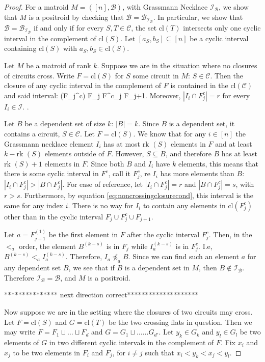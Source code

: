 \documentclass[11pt]{article}
\newcommand{\sanote}{\todo[color=violet!30]}
\newcommand{\rk}{\textrm{rk }}
\newcommand{\cl}{\textrm{cl}}
\def\ba #1\ea{\begin{align} #1 \end{align}}
\newcommand{\cI}{\mathcal{I}}
\newcommand{\sC}{\mathscr{C}}
\newcommand{\cB}{\mathcal{B}}
\theoremstyle{remark}
\theoremstyle{definition}
\begin{document}
\begin{proof}
For a matroid $M = ([n], \cB)$, with Grassmann Necklace $\cI_\cB$, we show that $M$ is a positroid by checking that $\cB = \cB_{\cI_\cB}$. In particular, we show that $\cB = \cB_{\cI_\cB}$ if and only if for every $S, T \in \sC$, the set $\cl(T)$ intersects only one cyclic interval in the complement of $\cl(S)$. Let $[a_S, b_S] \subseteq [n]$ be a cyclic interval containing $\cl(S)$ with $a_S, b_S \in \cl(S)$.

Let $M$ be a matroid of rank $k$. Suppose we are in the situation where no  closures of circuits cross. Write $F = \cl(S)$ for $S$ some circuit in $M$: $S \in \sC$. Then the closure of any cyclic interval in the complement of $F$ is contained in the $\cl(\sC)$ and said interval: \ba \cl(F_j^c) \subseteq F_{j} \cup F^c_{j} \cup F_{j+1}\;. \label{eq:noncrossingclosurecond}\ea Moreover, $|I_i \cap F^c_j| = r$ for every $I_i \in \cI$. \sanote{This is not quite right.}.

Let $B$ be a dependent set of size $k$: $|B| = k$. Since $B$ is a dependent set, it contains a circuit, $S \in \sC$. Let $F = \cl(S)$. We know that for any $i \in [n]$ the Grassmann necklace element $I_i$ has at most $\rk(S)$ elements in $F$ and at least $k - \rk(S)$ elements outside of $F$.  However, $S \subseteq B$, and therefore $B$ has at least $\rk(S) + 1 $ elements in $F$. Since both $B$ and $I_i$ have $k$ elements, this means that there is some cyclic interval in $F^c$, call it $F^c_j$,   re $I_i$ has more elements than $B$: $|I_i \cap F^c_j| > |B \cap F^c_j|$. For ease of reference, let $|I_i \cap F^c_j| = r$ and $|B \cap F^c_j|=s$, with $r > s$. Furthermore, by equation \eqref{eq:noncrossingclosurecond}, this interval is the same for any index $i$. There is no way for $I_i$ to contain any elements in $\cl(F_j^c)$ other than in the cyclic interval $F_{j} \cup F^c_{j} \cup F_{j+1}$.

Let $a = F_{j+1}^{(1)}$ be the first element in $F$ after the cyclic interval $F_j^c$. Then, in the $<_a$ order, the element $B^{(k-s)}$ is in $F_{j}$ while $I_a^{(k-s)}$ is in $F^c_{j}$. I.e, $B^{(k-s)} <_a I_a^{(k-s)}$. Therefore, $I_a \not \preceq_a B$. Since we can find such an element $a$ for any dependent set $B$, we see that if $B$ is a dependent set in $M$, then $B \not \in \cI_\cB$. Therefore $\cI_\cB = \cB$, and $M$ is a positroid.


 *************** next direction correct********************
 
Now suppose we are in the setting where the closures of two circuits may cross. Let $F = \cl(S)$ and $G = \cl(T)$ be the two crossing flats in question. Then we may write $F = F_1 \sqcup \ldots \sqcup F_d$ and $G = G_1 \sqcup \ldots \ldots G_{d'}$. Let $y_k \in G_k$ and $y_l \in G_l$ be two elements of $G$ in two different cyclic intervals in the complement of $F$. Fix $x_i$ and $x_j$ to be two elements in $F_i$ and $F_j$, for $i \neq j$ such that $x_i < y_k<x_j<y_l$.


\end{proof}
\end{document}
